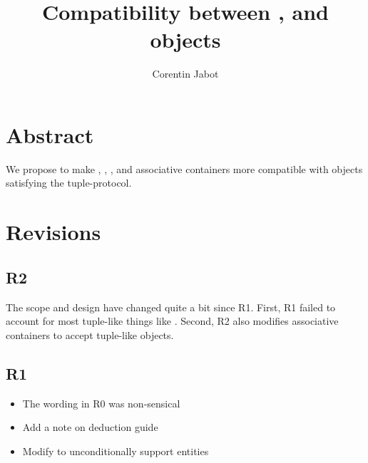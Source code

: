 \documentclass{wg21}
\title{Compatibility between \tcode{tuple}, \tcode{pair} and \placeholder{tuple-like} objects}
\author{Corentin Jabot}{corentin.jabot@gmail.com}
\begin{document}
\maketitle


\section{Abstract}

We propose to make , , , and associative containers more compatible with objects satisfying the tuple-protocol.

\section{Revisions}

\subsection{R2}

The scope and design have changed quite a bit since R1. First, R1 failed to account for most tuple-like things like .
Second, R2 also modifies associative containers to accept tuple-like objects.

\subsection{R1}
\begin{itemize}
    \item The wording in R0 was non-sensical
    \item Add a note on deduction guide
    \item Modify  to unconditionally support  entities
\end{itemize}
\end{document}
